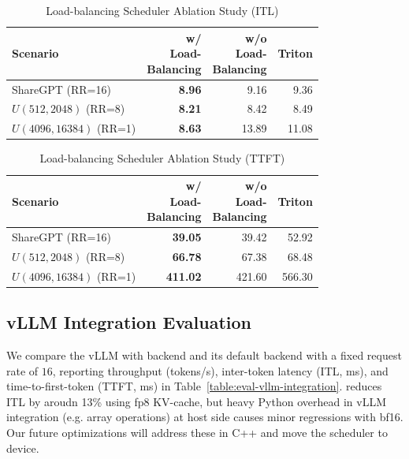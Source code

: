 \begin{table}[hbt]
\small
\centering
\vspace{-5pt}
\caption{Load-balancing Scheduler Ablation Study (ITL)}
\label{table:eval-ablation-itl}
\begin{tabular}{@{}lrrr@{}}
\toprule
Scenario & \makecell{w/ \\ Load- \\ Balancing} & \makecell{w/o \\ Load- \\ Balancing} & Triton \\
\midrule
ShareGPT (RR=16) & \textbf{8.96} & 9.16 & 9.36 \\
$U(512, 2048)$ (RR=8)        & \textbf{8.21} & 8.42 & 8.49 \\
$U(4096, 16384)$ (RR=1)        & \textbf{8.63} & 13.89 & 11.08 \\
\bottomrule
\end{tabular}
\end{table}

\begin{table}[hbt]
\small
\centering
\caption{Load-balancing Scheduler Ablation Study (TTFT)}
\label{table:eval-ablation-ttft}
\begin{tabular}{@{}lrrr@{}}
\toprule
Scenario & \makecell{w/ \\ Load- \\ Balancing} & \makecell{w/o \\ Load- \\ Balancing} & Triton \\
\midrule
ShareGPT (RR=16) & \textbf{39.05} & 39.42 & 52.92 \\
 $U(512, 2048)$ (RR=8)        & \textbf{66.78} & 67.38 & 68.48 \\
 $U(4096, 16384)$ (RR=1)        & \textbf{411.02} & 421.60 & 566.30 \\
\bottomrule
\end{tabular}
\end{table}

\subsection{vLLM Integration Evaluation}

We compare the vLLM with \sys backend and its default backend with a fixed request rate of $16$, reporting throughput (tokens/s), inter-token latency (ITL, ms), and time-to-first-token (TTFT, ms) in Table~\ref{table:eval-vllm-integration}.
\sys reduces ITL by aroudn 13\% using fp8 KV-cache, but heavy Python overhead in vLLM integration (e.g. array operations) at host side causes minor regressions with bf16. Our future optimizations will address these in C++ and move the scheduler to device.

